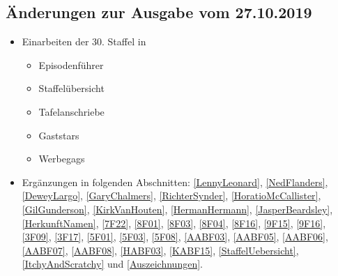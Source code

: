 \documentclass[pagesize,twoside,german]{scrbook}
\begin{document}
\subsection*{Änderungen zur Ausgabe vom 27.10.2019}
\begin{itemize}
	\item Einarbeiten der 30. Staffel in
	\begin{itemize}
		\item Episodenführer
		\item Staffelübersicht
		\item Tafelanschriebe
		\item Gaststars
		\item Werbegags
	\end{itemize}
	\item Ergänzungen in folgenden Abschnitten: \ref{LennyLeonard}, \ref{NedFlanders}, \ref{DeweyLargo}, \ref{GaryChalmers}, \ref{RichterSynder}, \ref{HoratioMcCallister}, \ref{GilGunderson}, \ref{KirkVanHouten}, \ref{HermanHermann}, \ref{JasperBeardsley}, \ref{HerkunftNamen}, \ref{7F22}, \ref{8F01}, \ref{8F03}, \ref{8F04}, \ref{8F16}, \ref{9F15}, \ref{9F16}, \ref{3F09}, \ref{3F17}, \ref{5F01}, \ref{5F03}, \ref{5F08}, \ref{AABF03}, \ref{AABF05}, \ref{AABF06}, \ref{AABF07}, \ref{AABF08}, \ref{HABF03}, \ref{KABF15}, \ref{StaffelUebersicht}, \ref{ItchyAndScratchy} und \ref{Auszeichnungen}.
\end{itemize}
\end{document}
